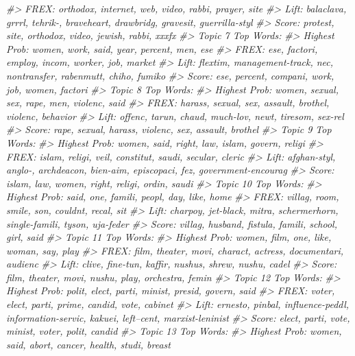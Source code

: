 \documentclass[]{book}
\newenvironment{Shaded}{\begin{snugshade}}{\end{snugshade}}
\newcommand{\CommentTok}[1]{\textcolor[rgb]{0.56,0.35,0.01}{\textit{#1}}}
\begin{document}
\begin{Shaded}
\begin{Highlighting}[]
\CommentTok{#>       FREX: orthodox, internet, web, video, rabbi, prayer, site }
\CommentTok{#>       Lift: balaclava, grrrl, tehrik-, braveheart, drawbridg, gravesit, guerrilla-styl }
\CommentTok{#>       Score: protest, site, orthodox, video, jewish, rabbi, xxxfx }
\CommentTok{#> Topic 7 Top Words:}
\CommentTok{#>       Highest Prob: women, work, said, year, percent, men, ese }
\CommentTok{#>       FREX: ese, factori, employ, incom, worker, job, market }
\CommentTok{#>       Lift: flextim, management-track, nec, nontransfer, rabenmutt, chiho, fumiko }
\CommentTok{#>       Score: ese, percent, compani, work, job, women, factori }
\CommentTok{#> Topic 8 Top Words:}
\CommentTok{#>       Highest Prob: women, sexual, sex, rape, men, violenc, said }
\CommentTok{#>       FREX: harass, sexual, sex, assault, brothel, violenc, behavior }
\CommentTok{#>       Lift: offenc, tarun, chaud, much-lov, newt, tiresom, sex-rel }
\CommentTok{#>       Score: rape, sexual, harass, violenc, sex, assault, brothel }
\CommentTok{#> Topic 9 Top Words:}
\CommentTok{#>       Highest Prob: women, said, right, law, islam, govern, religi }
\CommentTok{#>       FREX: islam, religi, veil, constitut, saudi, secular, cleric }
\CommentTok{#>       Lift: afghan-styl, anglo-, archdeacon, bien-aim, episcopaci, fez, government-encourag }
\CommentTok{#>       Score: islam, law, women, right, religi, ordin, saudi }
\CommentTok{#> Topic 10 Top Words:}
\CommentTok{#>       Highest Prob: said, one, famili, peopl, day, like, home }
\CommentTok{#>       FREX: villag, room, smile, son, couldnt, recal, sit }
\CommentTok{#>       Lift: charpoy, jet-black, mitra, schermerhorn, single-famili, tyson, uja-feder }
\CommentTok{#>       Score: villag, husband, fistula, famili, school, girl, said }
\CommentTok{#> Topic 11 Top Words:}
\CommentTok{#>       Highest Prob: women, film, one, like, woman, say, play }
\CommentTok{#>       FREX: film, theater, movi, charact, actress, documentari, audienc }
\CommentTok{#>       Lift: clive, fine-tun, kaffir, nushus, shrew, nushu, cadel }
\CommentTok{#>       Score: film, theater, movi, nushu, play, orchestra, femin }
\CommentTok{#> Topic 12 Top Words:}
\CommentTok{#>       Highest Prob: polit, elect, parti, minist, presid, govern, said }
\CommentTok{#>       FREX: voter, elect, parti, prime, candid, vote, cabinet }
\CommentTok{#>       Lift: ernesto, pinbal, influence-peddl, information-servic, kakuei, left--cent, marxist-leninist }
\CommentTok{#>       Score: elect, parti, vote, minist, voter, polit, candid }
\CommentTok{#> Topic 13 Top Words:}
\CommentTok{#>       Highest Prob: women, said, abort, cancer, health, studi, breast }

\end{Highlighting}
\end{Shaded}
\end{document}
